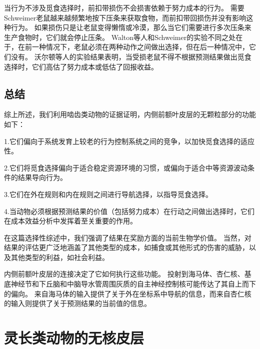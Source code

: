 当行为不涉及觅食选择时，前扣带损伤不会损害依赖于努力成本的行为。
需要Schweimer\cite{schweimer2005involvement}老鼠越来越频繁地按下压条来获取食物，而前扣带回损伤并没有影响这种行为。
如果损伤只是让老鼠变得懒惰或冷漠，那么当它们需要进行多次压条来生产食物时，它们就会停止压条。
Walton等人\cite{walton2002role}和Schweimer\cite{schweimer2005involvement}的实验不同之处在于，在前一种情况下，老鼠必须在两种动作之间做出选择，但在后一种情况中，它们没有。
沃尔顿等人的实验结果表明，当受损老鼠不得不根据预测结果做出觅食选择时，它们高估了努力成本或低估了回报收益。\par



\subsection{总结}

综上所述，我们利用啮齿类动物的证据证明，内侧前额叶皮层的无颗粒部分的功能如下：\par


1.它们偏向于系统发育上较老的行为控制系统之间的竞争，以加快觅食选择的适应性。\par


2.它们将觅食选择偏向于适合稳定资源环境的习惯，或偏向于适合中等资源波动条件的结果导向行为。\par


3.它们在外在规则和内在规则之间进行导航选择，以指导觅食选择。\par


4.当动物必须根据预测结果的价值（包括努力成本）在行动之间做出选择时，它们在成本效益分析中发挥着至关重要的作用。\par


在这篇选择性综述中，我们强调了结果在奖励方面的当前生物学价值。
当然，对结果的评估更广泛地涵盖了其他类型的成本，如捕食或其他形式的伤害的威胁，以及其他类型的利益，如社会利益。\par


内侧前额叶皮层的连接决定了它如何执行这些功能。
投射到海马体、杏仁核、基底神经节和下丘脑和中脑导水管周围灰质的自主神经控制核可能传达了其自上而下的偏向。
来自海马体的输入提供了关于外在坐标系中导航的信息，而来自杏仁核的输入则提供了关于预测结果的当前值的信息。\par



\section{灵长类动物的无核皮层}

